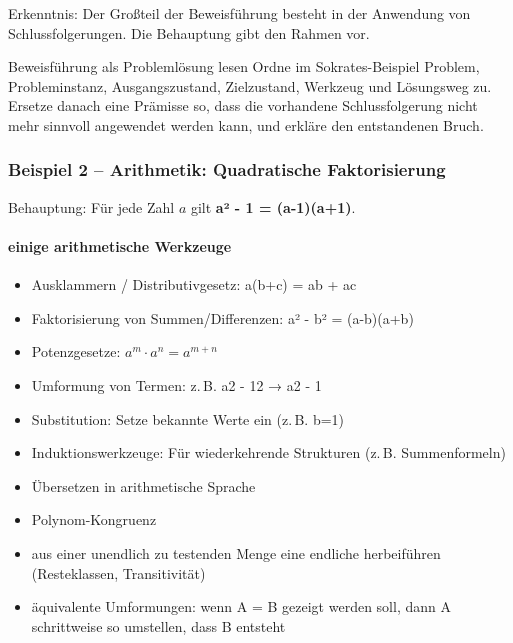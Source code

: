\documentclass{article}
\begin{document}
        Erkenntnis: Der Großteil der Beweisführung besteht in der Anwendung von Schlussfolgerungen. Die Behauptung gibt den Rahmen vor.

      \begin{uebung}{Beweisführung als Problemlösung lesen}
      Ordne im Sokrates-Beispiel Problem, Probleminstanz, Ausgangszustand, Zielzustand, Werkzeug und Lösungsweg zu. Ersetze danach eine Prämisse so, dass die vorhandene Schlussfolgerung nicht mehr sinnvoll angewendet werden kann, und erkläre den entstandenen Bruch.
      \end{uebung}
      


      \subsubsection{Beispiel 2 – Arithmetik: Quadratische Faktorisierung}
      

        Behauptung: Für jede Zahl \(a\) gilt \textbf{a² - 1 = (a-1)(a+1)}.
      


      \paragraph{einige arithmetische Werkzeuge}
      \begin{itemize}
        \item Ausklammern / Distributivgesetz: a(b+c) = ab + ac

        \item Faktorisierung von Summen/Differenzen: a² - b² = (a-b)(a+b)

        \item Potenzgesetze: $a^m \cdot a^n = a^{m+n}$

        \item Umformung von Termen: z.\,B. a2 - 12 → a2 - 1

        \item Substitution: Setze bekannte Werte ein (z.\,B. b=1)

        \item Induktionswerkzeuge: Für wiederkehrende Strukturen (z.\,B. Summenformeln)

        \item Übersetzen in arithmetische Sprache

        \item Polynom-Kongruenz

        \item aus einer unendlich zu testenden Menge eine endliche herbeiführen (Resteklassen, Transitivität)

        \item äquivalente Umformungen: wenn A = B gezeigt werden soll, dann A schrittweise so umstellen, dass B entsteht

      \end{itemize}
\end{document}
